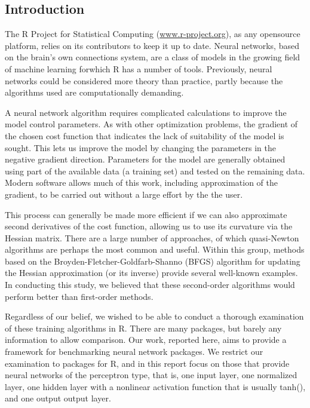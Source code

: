 \hypertarget{introduction}{%
\subsection{Introduction}\label{introduction}}

The R Project for Statistical Computing (\url{www.r-project.org}), as
any opensource platform, relies on its contributors to keep it up to
date. Neural networks, based on the brain's own connections system, are
a class of models in the growing field of machine learning forwhich R
has a number of tools. Previously, neural networks could be considered
more theory than practice, partly because the algorithms used are
computationally demanding.

A neural network algorithm requires complicated calculations to improve
the model control parameters. As with other optimization problems, the
gradient of the chosen cost function that indicates the lack of
suitability of the model is sought. This lets us improve the model by
changing the parameters in the negative gradient direction. Parameters
for the model are generally obtained using part of the available data (a
training set) and tested on the remaining data. Modern software allows
much of this work, including approximation of the gradient, to be
carried out without a large effort by the the user.

This process can generally be made more efficient if we can also
approximate second derivatives of the cost function, allowing us to use
its curvature via the Hessian matrix. There are a large number of
approaches, of which quasi-Newton algorithms are perhaps the most common
and useful. Within this group, methods based on the
Broyden-Fletcher-Goldfarb-Shanno (BFGS) algorithm for updating the
Hessian approximation (or its inverse) provide several well-known
examples. In conducting this study, we believed that these second-order
algorithms would perform better than first-order methods.

Regardless of our belief, we wished to be able to conduct a thorough
examination of these training algorithms in R. There are many packages,
but barely any information to allow comparison. Our work, reported here,
aims to provide a framework for benchmarking neural network packages. We
restrict our examination to packages for R, and in this report focus on
those that provide neural networks of the perceptron type, that is, one
input layer, one normalized layer, one hidden layer with a nonlinear
activation function that is usually tanh(), and one output output layer.

